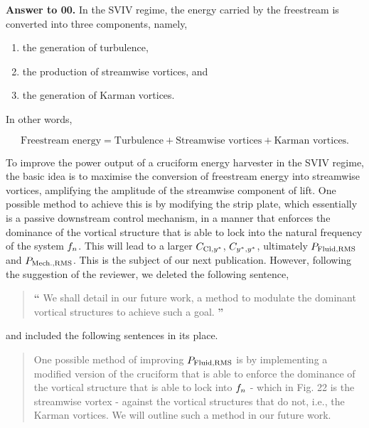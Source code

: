 \documentclass[12pt]{article}
\newcounter{question}
\newcommand{\name}{00}
\newcommand{\question}[1]{\refstepcounter{question} \noindent \textbf{Comment \name.\thequestion}\vskip 0.25cm \noindent \emph{#1}\\}
\newcommand{\answer}[1]{\noindent \textbf{Answer to \name.\thequestion}\vskip 0.25cm \noindent #1 \mbox{}\\}
\newcommand{\newperson}[2]{\renewcommand{\name}{#2} \setcounter{question}{0} \noindent \textbf{\large Answers to #1} \\}
\begin{document}
\answer{
  In the SVIV regime, the energy carried by the freestream is converted into three components, namely,

  \begin{enumerate}
    \item the generation of turbulence,
    \item the production of streamwise vortices, and
    \item the generation of Karman vortices.
  \end{enumerate}

  \noindent In other words,

  \begin{equation}
    \text{Freestream energy} = \text{Turbulence} + \text{Streamwise vortices} + \text{Karman vortices}.
    \label{eq:freesteamEnergy}
  \end{equation}
  
  \noindent To improve the power output of a cruciform energy harvester in the SVIV regime, the basic idea is to maximise the conversion of freestream energy into streamwise vortices, amplifying the \rms{} amplitude of the streamwise component of lift. One possible method to achieve this is by modifying the strip plate, which essentially is a passive downstream control mechanism, in a manner that enforces the dominance of the vortical structure that is able to lock into the natural frequency of the system $f_{n}$. This will lead to a larger $C_{\text{Cl},y^{*}}$, $C_{y^{*},y^{*}}$, ultimately $P_{\text{Fluid,RMS}}$ and $P_{\text{Mech.,RMS}}$. This is the subject of our next publication. However, following the suggestion of the reviewer, we deleted the following sentence,


  \begin{quotation}
    \hspace*{-1.3cm} {\Large \textbf{``}} We shall detail in our future work, a method to modulate the dominant vortical structures to achieve such a goal. {\Large \textbf{''}}
  \end{quotation}

  \noindent and included the following sentences in its place.

  \begin{quotation}
    \color{blue}
    \noindent One possible method of improving $P_{\text{Fluid,RMS}}$ is by implementing a modified version of the cruciform that is able to enforce the dominance of the vortical structure that is able to lock into $f_{n}$ - which in Fig. 22 is the streamwise vortex - against the vortical structures that do not, i.e., the Karman vortices. We will outline such a method in our future work.
  \end{quotation}
  \color{black}
}
% 
% 
\newpage


\end{document}
